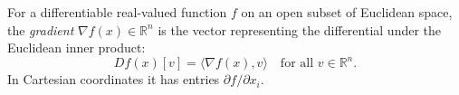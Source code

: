 
For a differentiable real-valued function $f$ on an open subset of Euclidean space, the \emph{gradient} $\nabla f(x)\in\mathbb R^n$ is the vector representing the differential under the Euclidean inner product:
\[
Df(x)[v]=\langle\nabla f(x),v\rangle\quad\text{for all }v\in\mathbb R^n.
\]
In Cartesian coordinates it has entries $\partial f/\partial x_i$.
